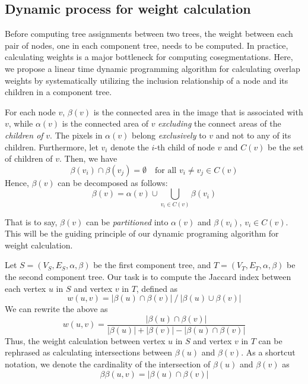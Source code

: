 \subsection{Dynamic process for weight calculation}
Before computing tree assignments between two trees, the weight between each pair of nodes, one in each component tree, needs to be computed. In practice, calculating weights is a major bottleneck for computing cosegmentations. Here, we propose a linear time dynamic programming algorithm for calculating overlap weights by systematically utilizing the inclusion relationship of a node and its children in a component tree.

For each node $v$, $\beta(v)$ is the connected area in the image that is
associated with $v$, while $\alpha(v)$ is the connected area of $v$
\emph{excluding} the connect areas of the \emph{children of} $v$. The 
pixels in $\alpha(v)$ belong \emph{exclusively} to $v$ and not to any of its
children. Furthermore, let $v_i$ denote the $i$-th child of node $v$ and
$C(v)$ be the set of children of $v$. Then, we have
\begin{equation*} \label{eqn:beta-disjoint}
\beta(v_i)\cap\beta(v_j)=\emptyset\quad\mbox{for all $v_i\neq v_j\in C(v)$}
\end{equation*}
Hence, $\beta(v)$ can be decomposed as follows:
\begin{equation*} \label{eqn:beta-decompose}
\beta(v) = \alpha(v)\cup\bigcup_{v_i \in C(v)} \beta(v_i)   
\end{equation*}

That is to say, $\beta(v)$ can be \emph{partitioned} into $\alpha(v)$ and
$\beta(v_i)$, $v_i \in C(v)$.  This will be the guiding principle of our
dynamic programing algorithm for weight calculation.

Let $S=(V_S,E_S,\alpha,\beta)$ be the first component tree, and
$T=(V_T,E_T,\alpha,\beta)$ be the second component tree. Our task is to compute
the Jaccard index between each vertex $u$ in $S$ and vertex $v$ in $T$, defined
as
\begin{equation*}
w(u,v) = |\beta(u) \cap \beta(v)| ~/~ |\beta(u) \cup \beta(v)|
\end{equation*}
We can rewrite the above as
\begin{equation*}\label{eqn:jaccard-rephrase}
w(u,v) = \frac{|\beta(u) \cap \beta(v)|}{|\beta(u)| + |\beta(v)| - |\beta(u) \cap \beta(v)|}
\end{equation*}
Thus, the weight calculation between vertex $u$ in $S$ and vertex $v$ in $T$ can
be rephrased as calculating intersections between $\beta(u)$ and $\beta(v)$. As
a shortcut notation, we denote the cardinality of the intersection of $\beta(u)$
and $\beta(v)$ as
\begin{equation*}
  \label{eqn:betabeta}
  \beta\beta(u,v) = |\beta(u) \cap \beta(v)|  
\end{equation*}

